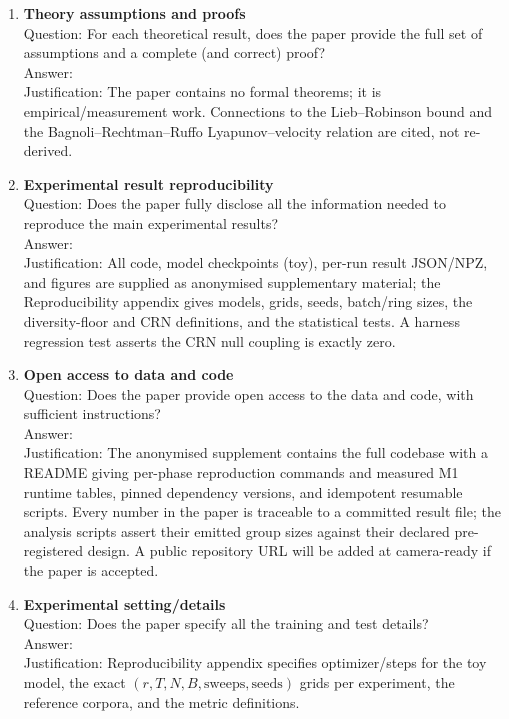 \begin{enumerate}
\item {\bf Theory assumptions and proofs} \\
Question: For each theoretical result, does the paper provide the full set of assumptions and a complete (and correct) proof? \\
Answer: \answerNA{} \\
Justification: The paper contains no formal theorems; it is empirical/measurement work. Connections to the Lieb--Robinson bound and the Bagnoli--Rechtman--Ruffo Lyapunov--velocity relation are cited, not re-derived.

\item {\bf Experimental result reproducibility} \\
Question: Does the paper fully disclose all the information needed to reproduce the main experimental results? \\
Answer: \answerYes{} \\
Justification: All code, model checkpoints (toy), per-run result JSON/NPZ, and figures are supplied as anonymised supplementary material; the Reproducibility appendix gives models, grids, seeds, batch/ring sizes, the diversity-floor and CRN definitions, and the statistical tests. A harness regression test asserts the CRN null coupling is exactly zero.

\item {\bf Open access to data and code} \\
Question: Does the paper provide open access to the data and code, with sufficient instructions? \\
Answer: \answerYes{} \\
Justification: The anonymised supplement contains the full codebase with a README giving per-phase reproduction commands and measured M1 runtime tables, pinned dependency versions, and idempotent resumable scripts. Every number in the paper is traceable to a committed result file; the analysis scripts assert their emitted group sizes against their declared pre-registered design. A public repository URL will be added at camera-ready if the paper is accepted.

\item {\bf Experimental setting/details} \\
Question: Does the paper specify all the training and test details? \\
Answer: \answerYes{} \\
Justification: Reproducibility appendix specifies optimizer/steps for the toy model, the exact $(r,T,N,B,\text{sweeps},\text{seeds})$ grids per experiment, the reference corpora, and the metric definitions.


\end{enumerate}
